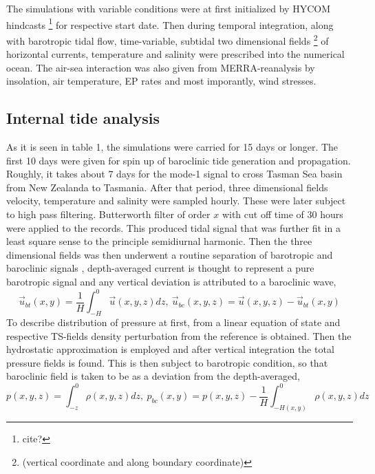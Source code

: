 \documentclass[12pt]{article}
\begin{document}
The simulations with variable conditions were at first initialized by HYCOM hindcasts 
\footnote{cite?} for respective start date. Then during temporal integration, along with 
barotropic tidal flow, time-variable, subtidal two dimensional fields \footnote{(vertical 
coordinate and along boundary coordinate)} of horizontal currents, temperature and salinity were 
prescribed into the numerical ocean. The air-sea interaction was also given from MERRA-reanalysis 
\citep{rienecker2011merra} by insolation, air  temperature, EP rates and most imporantly, wind 
stresses.

\subsection{Internal tide analysis}
As it is seen in table 1, the simulations were carried for 15 days or longer. The first 10 days 
were given for spin up of baroclinic tide generation and propagation. Roughly, it takes about 7 
days for the mode-1 signal to cross Tasman Sea basin from New Zealanda to Tasmania. After that 
period, three dimensional fields velocity, temperature and salinity were sampled hourly. These were 
later subject to high pass filtering. Butterworth filter of order $x$ with cut off time of $30$ 
hours were applied to the records. This produced tidal signal that was further fit in a least 
square sense to the principle semidiurnal harmonic. Then the three dimensional fields was then 
underwent a routine separation of barotropic and baroclinic signals \citep{cummins1997simulation, 
kunze2002internal, carter2008energetics}, depth-averaged current is thought to represent a pure 
barotropic signal and any vertical deviation is attributed to a baroclinic wave,
\begin{equation}
\label{ch2:bt_bc_vel}
\vec{u}_{bt}(x,y) = \frac{1}{H} \int_{-H}^{0} \vec{u}(x,y,z)  dz,~\vec{u}_{bc}(x,y,z) =  
\vec{u}(x,y,z) - \vec{u}_{bt}(x,y)
\end{equation}
To describe distribution of pressure at first, from a linear equation of state and respective 
TS-fields density perturbation from the reference is obtained. Then the hydrostatic approximation 
is employed and after vertical integration the total pressure fields is found. This is then subject 
to barotropic condition, so that baroclinic field is taken to be as a deviation from the 
depth-averaged,
\begin{equation}
\label{ch2:bt_bc_pres}
p(x,y,z) = \int_{-z}^{0} \rho(x,y,z) dz,~p_{bc}(x,y) = p(x,y,z) - \frac{1}{H} \int_{-H(x,y)}^{0} 
\rho(x,y,z) dz
\end{equation}
\end{document}
